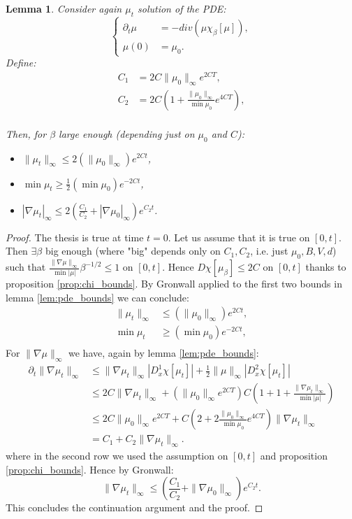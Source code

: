 \documentclass{article}
\numberwithin{theorem}{section}
\newtheorem{lemma}[theorem]{Lemma}
\begin{document}
\begin{lemma}
\label{lem:continuity_argument}
Consider again $\mu_t$ solution of the PDE:
 $$
    \begin{cases}
    \partial_t \mu &= -div(\mu \chi_\beta[\mu]),\\
    \mu(0)&=\mu_0.
    \end{cases}
$$
Define:
\begin{align*}
C_1&=2C\|\mu_0\|_{\infty}e^{2CT},\\
C_2&=2C\left(1+\frac{\|\mu_0\|_{\infty}}{\min \mu_0}e^{4CT}\right),\\
\end{align*}

Then, for $\beta$ large enough (depending just on $\mu_0$ and $C$):
\begin{itemize}
\item $\| \mu_t\|_{\infty} \leq 2(\| \mu_0\|_{\infty})e^{2Ct}$,
\item$ \min \mu_t \geq \frac{1}{2}(\min \mu_0)e^{-2Ct}$,
\item $|\nabla \mu_t|_{\infty} \leq 2\left(\frac{C_1}{C_2}+|\nabla \mu_0|_{\infty}\right)e^{C_2t}$.
\end{itemize}
\end{lemma}
\begin{proof}
The thesis is true at time $t=0$. Let us assume that it is true on $[0,t]$. Then $\exists \beta$ big enough (where "big" depends only on $C_1,C_2$, i.e. just $\mu_0, B, V, d$) such that $\frac{\|\nabla \mu\|_{\infty}}{\min |\mu|}\beta^{-1/2}\leq 1$ on $[0,t]$. Hence $D\chi[\mu_\beta]\leq 2C$ on $[0,t]$ thanks to proposition \ref{prop:chi_bounds}. By Gronwall applied to the first two bounds in lemma \ref{lem:pde_bounds} we can conclude:
\begin{align*}
\|\mu_t\|_{\infty} &\leq (\|\mu_0\|_\infty)e^{2Ct},\\
\min \mu_t &\geq (\min \mu_0)e^{-2Ct},\\
\end{align*}
For $\|\nabla \mu\|_{\infty}$ we have, again by lemma \ref{lem:pde_bounds}:
\begin{align*}
\partial_t \|\nabla \mu_t\|_{\infty} &\leq \|\nabla \mu_t\|_{\infty}  |D^1_x\chi[\mu_t]| +\frac{1}{2}\|\mu\|_\infty|D^2_x\chi[\mu_t]|\\
&\leq 2C\|\nabla \mu_t\|_{\infty}+\left( \|\mu_0\|_\infty e^{2CT}\right)C\left(1+1+\frac{\|\nabla \mu_t\|_{\infty}}{\min |\mu|}\right)\\
&\leq 2C \|\mu_0\|_{\infty} e^{2CT} + C\left(2+2\frac{ \|\mu_0\|_{\infty}}{\min \mu_0}e^{4CT}\right)\|\nabla \mu_t\|_{\infty}\\
&= C_1 + C_2\|\nabla \mu_t\|_{\infty}.
\end{align*}
where in the second row we used the assumption on $[0,t]$ and proposition \ref{prop:chi_bounds}. Hence by Gronwall:
$$
\|\nabla \mu_t\|_{\infty} \leq \left(\frac{C_1}{C_2} + \|\nabla \mu_0\|_{\infty}\right) e^{C_2t}.
$$
This concludes the continuation argument and the proof.
\end{proof}
\end{document}
